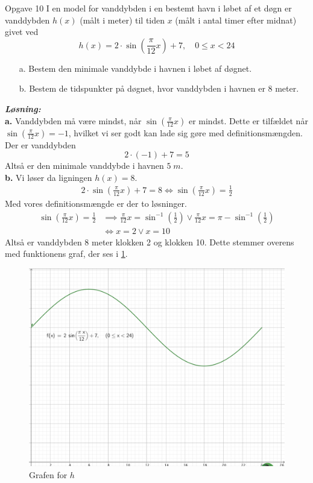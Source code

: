 \documentclass{article}
\newcommand{\sol}{\setlength{\parindent}{0cm}\textbf{\textit{Løsning:}}\setlength{\parindent}{1cm}}
\begin{document}
\begin{question}{Opgave 10}{}
  I en model for vanddybden i en bestemt havn i løbet af et døgn er vanddybden $h(x)$
(målt i meter) til tiden $x$ (målt i antal timer efter midnat) givet ved
\[
  h(x)=2 \cdot \sin \left(\frac{\pi}{12}x\right) +7, \quad 0 \leq x < 24
\] 
\begin{itemize}
  \item[a.] Bestem den minimale vanddybde i havnen i løbet af døgnet.
  \item[b.] Bestem de tidspunkter på døgnet, hvor vanddybden i havnen er 8 meter.
\end{itemize}
\end{question}
\sol \\
\textbf{a.}
Vanddybden må være mindst, når $\sin\left(\frac{\pi}{12}x\right)$ er mindst. 
Dette er tilfældet når $\sin\left(\frac{\pi}{12}x\right)=-1$, hvilket vi ser godt kan lade sig gøre med definitionsmængden. 
Der er vanddybden
\[
2 \cdot (-1)+7 =5
\] 
Altså er den minimale vanddybde i havnen $5 \;\unit{m} $.\\[1ex]
\textbf{b.}
Vi løser da ligningen $h(x)=8$.
\begin{equation*}
\begin{split}
  2 \cdot \sin\left(\frac{\pi}{12}x\right)+7=8 \iff \sin\left(\frac{\pi}{12}x\right)=\frac{1}{2}
\end{split}
\end{equation*}
Med vores definitionsmængde er der to løsninger.
\begin{equation*}
\begin{split}
  \sin\left(\frac{\pi}{12}x\right)=\frac{1}{2} &\implies \frac{\pi}{12}x = \sin^{-1}\left(\frac{1}{2}\right)\lor \frac{\pi}{12}x= \pi- \sin^{-1}\left(\frac{1}{2}\right) \\ 
  &\iff x=2 \lor x=10
\end{split}
\end{equation*}
Altså er vanddybden 8 meter klokken 2 og klokken 10. 
Dette stemmer overens med funktionens graf, der ses i \cref{fig:vand}.
\begin{figure}[H]
\begin{center}
  \includegraphics[width=\textwidth]{vand.png}
\end{center}
  \caption{Grafen for $h$}
\label{fig:vand}
\end{figure}
\end{document}
